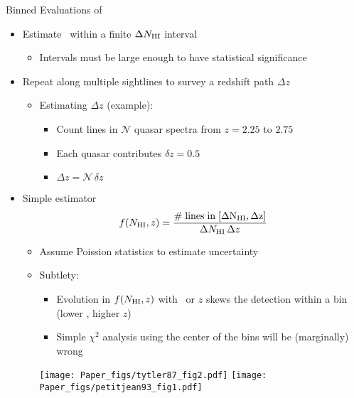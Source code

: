 \documentclass[12pt,letterpaper]{article}
\begin{document}
\begin{Aenumerate}
{\bf \item Binned Evaluations of \fnhi}
 \begin{itemize}
 \item Estimate \fnhi\ within a finite $\Delta N_{\rm HI}$ interval
 	\begin{itemize}
 	\item Intervals must be large enough to have statistical significance
 	\end{itemize}
 \item Repeat along multiple sightlines to survey a redshift path $\Delta z$
 	\begin{itemize}
 	\item  Estimating $\Delta z$ (example):
 		\begin{itemize}
 		\item Count lines in $\mathcal{N}$ quasar spectra from $z=2.25$ to $2.75$
 		\item Each quasar contributes $\delta z = 0.5$
 		\item $\Delta z = \mathcal{N} \, \delta z$
 		\end{itemize}
 	\end{itemize}
 \item Simple estimator
 \begin{equation}
 f(N_{\rm HI},z) = \frac{\rm \# \; lines \; in \; [\Delta N_{\rm HI},\Delta z]}{
 \Delta N_{\rm HI} \, \Delta z}
 \end{equation}
 	\begin{itemize}
 	\item Assume Poission statistics to estimate uncertainty
 	\item Subtlety: 
 		\begin{itemize}
 		\item Evolution in $f(N_{\rm HI},z)$ with \nhi\ or $z$ 
 		skews the detection within a bin (lower \nhi, higher $z$)
 		\item Simple $\chi^2$ analysis using the center of the
 		bins will be (marginally) wrong
 		\end{itemize}
	\texttt{[image: Paper\_figs/tytler87\_fig2.pdf]}
	\texttt{[image: Paper\_figs/petitjean93\_fig1.pdf]}


\end{itemize}
\end{itemize}
\end{Aenumerate}
\end{document}

